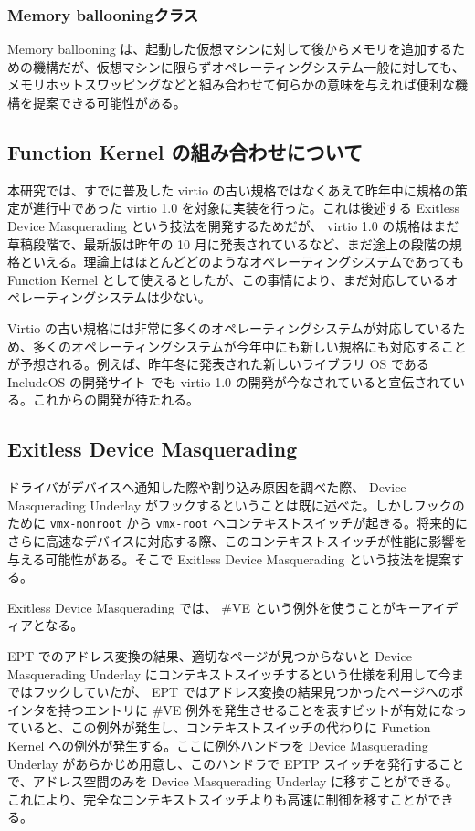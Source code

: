 \documentclass[a4paper,11pt,report]{ltjsbook}
\begin{document}
\subsubsection{Memory ballooningクラス}

Memory ballooning は、起動した仮想マシンに対して後からメモリを追加するための機構だが、仮想マシンに限らずオペレーティングシステム一般に対しても、メモリホットスワッピングなどと組み合わせて何らかの意味を与えれば便利な機構を提案できる可能性がある。

\subsection{Function Kernel の組み合わせについて}

本研究では、すでに普及した virtio の古い規格ではなくあえて昨年中に規格の策定が進行中であった virtio 1.0 を対象に実装を行った。これは後述する Exitless Device Masquerading という技法を開発するためだが、 virtio 1.0 の規格はまだ草稿段階で、最新版は昨年の 10 月に発表されているなど、まだ途上の段階の規格といえる。理論上はほとんどどのようなオペレーティングシステムであっても Function Kernel として使えるとしたが、この事情により、まだ対応しているオペレーティングシステムは少ない。

Virtio の古い規格には非常に多くのオペレーティングシステムが対応しているため、多くのオペレーティングシステムが今年中にも新しい規格にも対応することが予想される。例えば、昨年冬に発表された新しいライブラリ OS である IncludeOS\cite{includeos} の開発サイト\cite{incosdev} でも virtio 1.0 の開発が今なされていると宣伝されている。これからの開発が待たれる。

\subsection{Exitless Device Masquerading}

ドライバがデバイスへ通知した際や割り込み原因を調べた際、 Device Masquerading Underlay がフックするということは既に述べた。しかしフックのために \texttt{vmx-nonroot} から \texttt{vmx-root} へコンテキストスイッチが起きる。将来的にさらに高速なデバイスに対応する際、このコンテキストスイッチが性能に影響を与える可能性がある。そこで Exitless Device Masquerading という技法を提案する。

Exitless Device Masquerading では、 \#VE という例外を使うことがキーアイディアとなる。

EPT でのアドレス変換の結果、適切なページが見つからないと Device Masquerading Underlay にコンテキストスイッチするという仕様を利用して今まではフックしていたが、 EPT ではアドレス変換の結果見つかったページへのポインタを持つエントリに \#VE 例外を発生させることを表すビットが有効になっていると、この例外が発生し、コンテキストスイッチの代わりに Function Kernel への例外が発生する。ここに例外ハンドラを Device Masquerading Underlay があらかじめ用意し、このハンドラで EPTP スイッチを発行することで、アドレス空間のみを Device Masquerading Underlay に移すことができる。これにより、完全なコンテキストスイッチよりも高速に制御を移すことができる。
\end{document}
